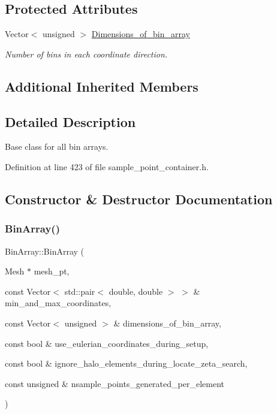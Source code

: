 \subsection*{Protected Attributes}
\begin{DoxyCompactItemize}
\item 
Vector$<$ unsigned $>$ \hyperlink{classBinArray_aaab4005f8563e42df5fc8e7ac626fedc}{Dimensions\+\_\+of\+\_\+bin\+\_\+array}
\begin{DoxyCompactList}\small\item\em Number of bins in each coordinate direction. \end{DoxyCompactList}\end{DoxyCompactItemize}
\subsection*{Additional Inherited Members}


\subsection{Detailed Description}
Base class for all bin arrays. 

Definition at line 423 of file sample\+\_\+point\+\_\+container.\+h.



\subsection{Constructor \& Destructor Documentation}
\mbox{\label{classBinArray_ae441b5dcc0d0276f4661a09ff735b581}} 
\subsubsection{\texorpdfstring{Bin\+Array()}{BinArray()}\hspace{0.1cm}{\footnotesize\ttfamily [1/3]}}
{\footnotesize\ttfamily Bin\+Array\+::\+Bin\+Array (\begin{DoxyParamCaption}\item[{Mesh $\ast$}]{mesh\+\_\+pt,  }\item[{const Vector$<$ std\+::pair$<$ double, double $>$ $>$ \&}]{min\+\_\+and\+\_\+max\+\_\+coordinates,  }\item[{const Vector$<$ unsigned $>$ \&}]{dimensions\+\_\+of\+\_\+bin\+\_\+array,  }\item[{const bool \&}]{use\+\_\+eulerian\+\_\+coordinates\+\_\+during\+\_\+setup,  }\item[{const bool \&}]{ignore\+\_\+halo\+\_\+elements\+\_\+during\+\_\+locate\+\_\+zeta\+\_\+search,  }\item[{const unsigned \&}]{nsample\+\_\+points\+\_\+generated\+\_\+per\+\_\+element }\end{DoxyParamCaption})\hspace{0.3cm}{\ttfamily [inline]}}



